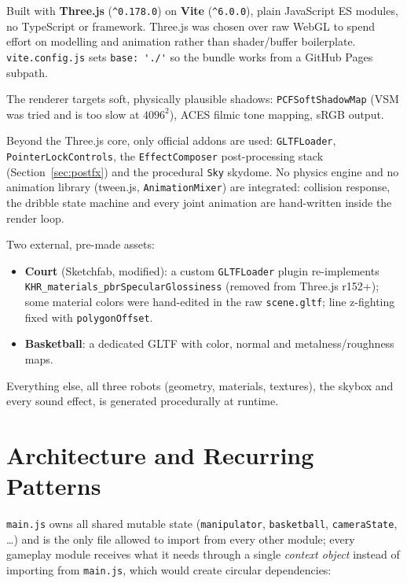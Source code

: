 \documentclass[11pt,a4paper]{article}
\newcommand{\code}[1]{\texttt{#1}}
\begin{document}
Built with \textbf{Three.js} (\code{\^{}0.178.0}) on \textbf{Vite} (\code{\^{}6.0.0}), plain JavaScript ES modules, no TypeScript or framework. Three.js was chosen over raw WebGL to spend effort on modelling and animation rather than shader/buffer boilerplate. \code{vite.config.js} sets \verb|base: './'| so the bundle works from a GitHub Pages subpath.

The renderer targets soft, physically plausible shadows: \code{PCFSoftShadowMap} (VSM was tried and is too slow at $4096^2$), ACES filmic tone mapping, sRGB output.

Beyond the Three.js core, only official addons are used: \code{GLTFLoader}, \code{PointerLockControls}, the \code{EffectComposer} post-processing stack (Section~\ref{sec:postfx}) and the procedural \code{Sky} skydome. No physics engine and no animation library (tween.js, \code{AnimationMixer}) are integrated: collision response, the dribble state machine and every joint animation are hand-written inside the render loop.

Two external, pre-made assets:
\begin{itemize}[nosep]
    \item \textbf{Court} (Sketchfab, modified): a custom \code{GLTFLoader} plugin re-implements \code{KHR\_materials\_pbrSpecularGlossiness} (removed from Three.js r152+); some material colors were hand-edited in the raw \code{scene.gltf}; line z-fighting fixed with \code{polygonOffset}.
    \item \textbf{Basketball}: a dedicated GLTF with color, normal and metalness/roughness maps.
\end{itemize}

Everything else, all three robots (geometry, materials, textures), the skybox and every sound effect, is generated procedurally at runtime.

\section{Architecture and Recurring Patterns}
\label{sec:arch}

\code{main.js} owns all shared mutable state (\code{manipulator}, \code{basketball}, \code{cameraState}, \ldots) and is the only file allowed to import from every other module; every gameplay module receives what it needs through a single \emph{context object} instead of importing from \code{main.js}, which would create circular dependencies:
\end{document}

